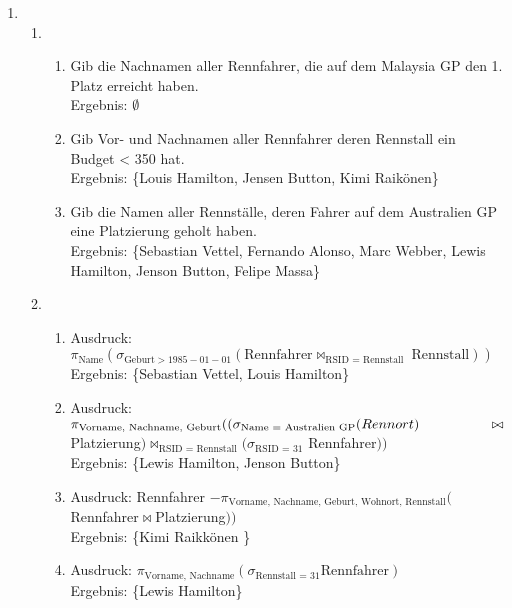 \documentclass[a4paper,11pt,fleqn]{scrartcl}
\begin{document}
\begin{enumerate}
\item
    \begin{enumerate}
    \item %
        \begin{enumerate}
            \item Gib die Nachnamen aller Rennfahrer, die auf dem Malaysia GP den 1. Platz erreicht haben.\\
                  Ergebnis: $\emptyset$
            \item Gib Vor- und Nachnamen aller Rennfahrer deren Rennstall ein Budget < 350 hat.\\
                  Ergebnis: \{Louis Hamilton, Jensen Button, Kimi Raikönen\}
            \item Gib die Namen aller Rennställe, deren Fahrer auf dem Australien GP eine Platzierung geholt haben.\\
                  Ergebnis: \{Sebastian Vettel, Fernando Alonso, Marc Webber, Lewis Hamilton, Jenson Button, Felipe Massa\} 
        \end{enumerate}
    \item %
        \begin{enumerate}
            \item Ausdruck: $\pi_{\text{Name}}(\sigma_{\text{Geburt} > 1985-01-01}(\text{Rennfahrer} \bowtie_{\text{RSID = Rennstall }}\text{Rennstall}))$\\
                  Ergebnis: \{Sebastian Vettel, Louis Hamilton\}\\
            \item Ausdruck: $\pi_{\text{Vorname, Nachname, Geburt}}((\sigma_{\text{Name = Australien GP}}(Rennort)\\ 
            \phantom{Ausdruck:} \bowtie $ Platzierung$) \bowtie_{\text{RSID = Rennstall}}(\sigma_{\text{RSID = 31}} $ Rennfahrer$))$ \\
                  Ergebnis: \{Lewis Hamilton, Jenson Button\}\\
            \item Ausdruck: Rennfahrer $ - \pi_{\text{Vorname, Nachname, Geburt, Wohnort, Rennstall}}($Rennfahrer$ \bowtie $Platzierung$)) $\\
                  Ergebnis: \{Kimi Raikkönen \}\\
            \item Ausdruck: $\pi_{\text{Vorname, Nachname}}(\sigma_{\text{Rennstall = 31}}\text{Rennfahrer})$\\
                  Ergebnis: \{Lewis Hamilton\} \\

\end{enumerate}
\end{enumerate}
\end{enumerate}
\end{document}
